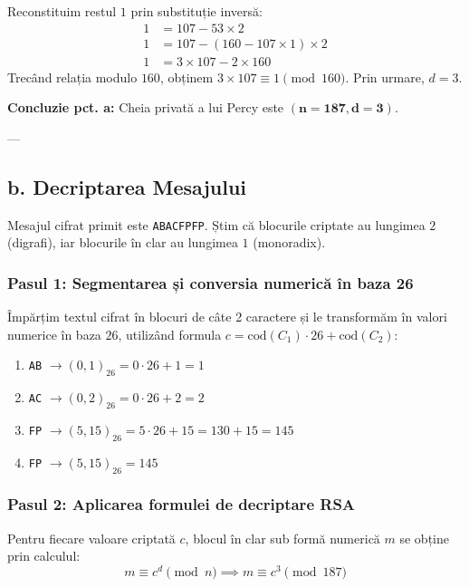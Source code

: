 \documentclass[12pt]{article}
\begin{document}
Reconstituim restul $1$ prin substituție inversă:
\begin{align*}
1 &= 107 - 53 \times 2 \\
1 &= 107 - (160 - 107 \times 1) \times 2 \\
1 &= 3 \times 107 - 2 \times 160
\end{align*}
Trecând relația modulo $160$, obținem $3 \times 107 \equiv 1 \pmod{160}$. Prin urmare, $d = 3$.

\textbf{Concluzie pct. a:} Cheia privată a lui Percy este $\mathbf{(n = 187, d = 3)}$.

---

\subsection*{b. Decriptarea Mesajului}

Mesajul cifrat primit este \texttt{ABACFPFP}. Știm că blocurile criptate au lungimea $2$ (digrafi), iar blocurile în clar au lungimea $1$ (monoradix).

\subsubsection*{Pasul 1: Segmentarea și conversia numerică în baza 26}
Împărțim textul cifrat în blocuri de câte 2 caractere și le transformăm în valori numerice în baza $26$, utilizând formula $c = \text{cod}(C_1) \cdot 26 + \text{cod}(C_2)$:
\begin{enumerate}
    \item \texttt{AB} $\rightarrow (0, 1)_{26} = 0 \cdot 26 + 1 = 1$
    \item \texttt{AC} $\rightarrow (0, 2)_{26} = 0 \cdot 26 + 2 = 2$
    \item \texttt{FP} $\rightarrow (5, 15)_{26} = 5 \cdot 26 + 15 = 130 + 15 = 145$
    \item \texttt{FP} $\rightarrow (5, 15)_{26} = 145$
\end{enumerate}

\subsubsection*{Pasul 2: Aplicarea formulei de decriptare RSA}
Pentru fiecare valoare criptată $c$, blocul în clar sub formă numerică $m$ se obține prin calculul:
\[
m \equiv c^d \pmod{n} \implies m \equiv c^3 \pmod{187}
\]
\end{document}

